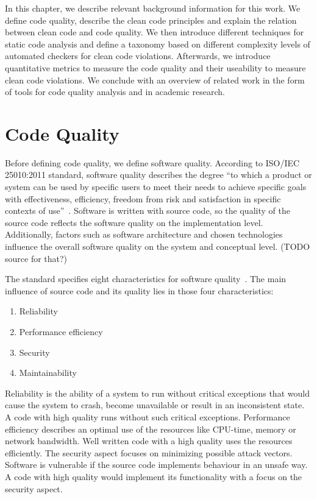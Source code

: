 In this chapter, we describe relevant background information for this work. We define code quality, describe the clean code principles and explain the relation between clean code and code quality. We then introduce different techniques for static code analysis and define a taxonomy based on different complexity levels of automated checkers for clean code violations. Afterwards, we introduce quantitative metrics to measure the code quality and their useability to measure clean code violations. We conclude with an overview of related work in the form of tools for code quality analysis and in academic research.

\section{Code Quality}\label{sec:code_quality}
Before defining code quality, we define software quality. According to ISO/IEC 25010:2011 standard, software quality describes the degree \enquote{to which a product or system can be used by specific users to meet their needs to achieve specific goals with effectiveness, efficiency, freedom from risk and satisfaction in specific contexts of use}~\cite{iso_central_secretary_isoiec_2011-1}. Software is written with source code, so the quality of the source code reflects the software quality on the implementation level. Additionally, factors such as software architecture and chosen technologies influence the overall software quality on the system and conceptual level. (TODO source for that?)

The standard specifies eight characteristics for software quality~\cite{iso_central_secretary_isoiec_2011-1}. The main influence of source code and its quality lies in those four characteristics:
\begin{enumerate}
    \item Reliability
    \item Performance efficiency
    \item Security
    \item Maintainability
\end{enumerate}
Reliability is the ability of a system to run without critical exceptions that would cause the system to crash, become unavailable or result in an inconsistent state. A code with high quality runs without such critical exceptions. Performance efficiency describes an optimal use of the resources like CPU-time, memory or network bandwidth. Well written code with a high quality uses the resources efficiently. The security aspect focuses on minimizing possible attack vectors. Software is vulnerable if the source code implements behaviour in an unsafe way. A code with high quality would implement its functionality with a focus on the security aspect. 

